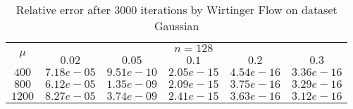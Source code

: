 \begin{table}\label{gaussian}
\centering
\begin{tabular}{|c|c|c|c|c|c|}

\hline
\multirow{2}{*}{ $\mu$} &\multicolumn{5}{c|}{$n = 128 $}\\\cline{2-6}
 &$0.02$ &$0.05$ &$0.1$ &$0.2$ &$0.3$\\\hline
$400$ & $7.18e-05$ & $9.51e-10$ & $2.05e-15$ & $4.54e-16$ & $3.36e-16$\\\hline
$800$ & $6.12e-05$ & $1.35e-09$ & $2.09e-15$ & $3.75e-16$ & $3.29e-16$\\\hline
$1200$ & $8.27e-05$ & $3.74e-09$ & $2.41e-15$ & $3.63e-16$ & $3.12e-16$\\\hline
\end{tabular}
\caption{Relative error after $3000$ iterations by Wirtinger Flow on dataset Gaussian}
\end{table}
